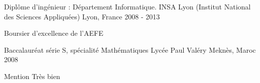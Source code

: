 


\begin{cventries}


\cventry
{Diplôme d'ingénieur : Département Informatique.} %
{INSA Lyon (Institut National des Sciences Appliquées)} %
{Lyon, France} %
{2008 - 2013} %
{ %
\begin{cvitems}
 \setlength\itemsep{1em}
\item {\scriptsize Boursier d'excellence de l'AEFE}
\end{cvitems}
}

\cventry
{\scriptsize Baccalauréat série S, spécialité Mathématiques} %
{\scriptsize Lycée Paul Valéry} %
{\scriptsize Meknès, Maroc} %
{\scriptsize 2008} %
{ %
\begin{cvitems}
 \setlength\itemsep{1em}
\item {\scriptsize Mention Très bien}
\end{cvitems}
}


\end{cventries}